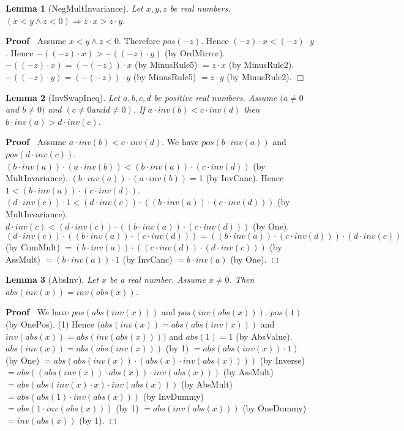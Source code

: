\documentclass{article}
\newenvironment{forthel}{\begin{leftbar}}{\end{leftbar}}
\newenvironment{proof}{\noindent\textbf{Proof\ }}{\hspace*{\fill}$\Box$\medskip}
\newtheorem{lemma}{Lemma}
\newcommand{\dotequal}{=}
\begin{document}
\begin{forthel}
	
	\begin{lemma}[NegMultInvariance]
	Let $x, y, z$ be real numbers.
	$(x < y \wedge z < 0) \Rightarrow z \cdot x > z \cdot y$.
	\end{lemma}
	\begin{proof}
	Assume $x < y \wedge z < 0$.
	Therefore $pos(-z)$.    
	Hence $(-z) \cdot x < (-z) \cdot y$.
	Hence $-((-z) \cdot x) > -((-z) \cdot y)$ (by OrdMirror).
	$-((-z) \cdot x) \dotequal (-(-z)) \cdot x$ (by MinusRule5)
	$\dotequal z \cdot x$ (by MinusRule2).
	$-((-z) \cdot y) \dotequal (-(-z)) \cdot y$ (by MinusRule5)
	$\dotequal z \cdot y$ (by MinusRule2).
	\end{proof}
	
	
	\begin{lemma}[InvSwapIneq]
	Let $a, b, c, d$ be positive real numbers. Assume $(a \neq 0$ and $b \neq 0)$ and $(c \neq 0 and d \neq 0)$. 
	If $a \cdot inv(b) < c \cdot inv(d)$ then $b \cdot inv(a) > d \cdot inv(c)$.
	\end{lemma}
	\begin{proof}
	Assume $a \cdot inv(b) < c \cdot inv(d)$.
	We have $pos(b \cdot inv(a))$ and $pos(d \cdot inv(c))$.
	$(b \cdot inv(a)) \cdot (a \cdot inv(b)) < (b \cdot inv(a)) \cdot (c \cdot inv(d))$ (by MultInvariance).
	$(b \cdot inv(a)) \cdot (a \cdot inv(b)) = $1 (by InvCanc).
	Hence $1 < (b \cdot inv(a)) \cdot (c \cdot inv(d))$.
	$(d \cdot inv(c)) \cdot 1 < (d \cdot inv(c)) \cdot ((b \cdot inv(a)) \cdot (c \cdot inv(d)))$ (by MultInvariance).
	$d \cdot inv(c) < (d \cdot inv(c)) \cdot ((b \cdot inv(a)) \cdot (c \cdot inv(d)))$ (by One).
	$(d \cdot inv(c)) \cdot ((b \cdot inv(a)) \cdot (c \cdot inv(d))) \dotequal ((b \cdot inv(a)) \cdot (c \cdot inv(d))) \cdot (d \cdot inv(c))$ (by ComMult)
	$\dotequal (b \cdot inv(a)) \cdot ((c \cdot inv(d)) \cdot (d \cdot inv(c)))$ (by AssMult)
	$\dotequal (b \cdot inv(a)) \cdot 1$ (by InvCanc)
	$\dotequal b \cdot inv(a)$ (by One).   
	\end{proof}
	
	
	
	\begin{lemma}[AbsInv]
	Let $x$ be a real number. Assume $x \neq 0$. Then $abs(inv(x)) = inv(abs(x))$.
	\end{lemma}
	\begin{proof}
	We have $pos(abs(inv(x)))$ and $pos(inv(abs(x)))$.
	$pos(1)$ (by OnePos).
	(1) Hence $( abs(inv(x)) = abs(abs(inv(x)))$ and $inv(abs(x)) = abs(inv(abs(x))) )$ and $abs(1) = 1$ (by AbsValue).
	$abs(inv(x)) \dotequal abs(abs(inv(x)))$ (by 1)
	$\dotequal abs(abs(inv(x)) \cdot 1)$ (by One)
	$\dotequal abs(abs(inv(x)) \cdot (abs(x) \cdot inv(abs(x))))$ (by Inverse)
	$\dotequal abs((abs(inv(x)) \cdot abs(x)) \cdot inv(abs(x)))$ (by AssMult)
	$\dotequal abs(abs(inv(x) \cdot x) \cdot inv(abs(x)))$ (by AbsMult)
	$\dotequal abs(abs(1) \cdot inv(abs(x)))$ (by InvDummy)
	$\dotequal abs(1 \cdot inv(abs(x)))$ (by 1) 
	$\dotequal abs(inv(abs(x)))$ (by OneDummy)
	$\dotequal inv(abs(x))$ (by 1).    
	\end{proof}
	

\end{forthel}
\end{document}
